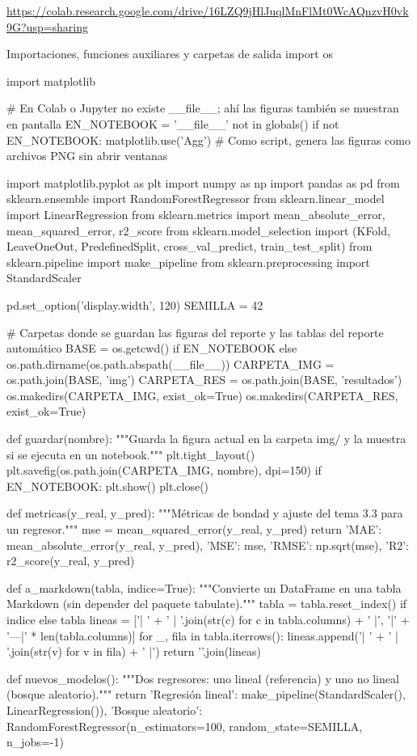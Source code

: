 \documentclass[11pt,letterpaper]{article}
\begin{document}
\begin{center}
    \url{https://colab.research.google.com/drive/16LZQ9jHlJuqlMnFlMt0WcAQnzvH0vk9G?usp=sharing}
\end{center}

\begin{codigo}[label=cod:comun]{Importaciones, funciones auxiliares y carpetas de salida}
import os

import matplotlib

# En Colab o Jupyter no existe __file__; ahí las figuras también se muestran en pantalla
EN_NOTEBOOK = '__file__' not in globals()
if not EN_NOTEBOOK:
    matplotlib.use('Agg')  # Como script, genera las figuras como archivos PNG sin abrir ventanas

import matplotlib.pyplot as plt
import numpy as np
import pandas as pd
from sklearn.ensemble import RandomForestRegressor
from sklearn.linear_model import LinearRegression
from sklearn.metrics import mean_absolute_error, mean_squared_error, r2_score
from sklearn.model_selection import (KFold, LeaveOneOut, PredefinedSplit, cross_val_predict,
                                     train_test_split)
from sklearn.pipeline import make_pipeline
from sklearn.preprocessing import StandardScaler

pd.set_option('display.width', 120)
SEMILLA = 42

# Carpetas donde se guardan las figuras del reporte y las tablas del reporte automático
BASE = os.getcwd() if EN_NOTEBOOK else os.path.dirname(os.path.abspath(__file__))
CARPETA_IMG = os.path.join(BASE, 'img')
CARPETA_RES = os.path.join(BASE, 'resultados')
os.makedirs(CARPETA_IMG, exist_ok=True)
os.makedirs(CARPETA_RES, exist_ok=True)


def guardar(nombre):
    """Guarda la figura actual en la carpeta img/ y la muestra si se ejecuta en un notebook."""
    plt.tight_layout()
    plt.savefig(os.path.join(CARPETA_IMG, nombre), dpi=150)
    if EN_NOTEBOOK:
        plt.show()
    plt.close()


def metricas(y_real, y_pred):
    """Métricas de bondad y ajuste del tema 3.3 para un regresor."""
    mse = mean_squared_error(y_real, y_pred)
    return {'MAE': mean_absolute_error(y_real, y_pred), 'MSE': mse,
            'RMSE': np.sqrt(mse), 'R2': r2_score(y_real, y_pred)}


def a_markdown(tabla, indice=True):
    """Convierte un DataFrame en una tabla Markdown (sin depender del paquete tabulate)."""
    tabla = tabla.reset_index() if indice else tabla
    lineas = ['| ' + ' | '.join(str(c) for c in tabla.columns) + ' |',
              '|' + '---|' * len(tabla.columns)]
    for _, fila in tabla.iterrows():
        lineas.append('| ' + ' | '.join(str(v) for v in fila) + ' |')
    return '\n'.join(lineas)


def nuevos_modelos():
    """Dos regresores: uno lineal (referencia) y uno no lineal (bosque aleatorio)."""
    return {'Regresión lineal': make_pipeline(StandardScaler(), LinearRegression()),
            'Bosque aleatorio': RandomForestRegressor(n_estimators=100, random_state=SEMILLA, n_jobs=-1)}
\end{codigo}
\end{document}
